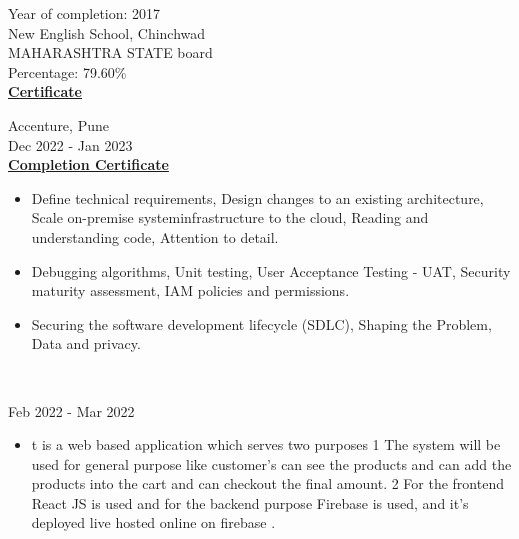 \documentclass[letterpaper,10pt]{memoir} %
\begin{document}

{Year of completion: 2017}\\
{New English School, Chinchwad}\\
{MAHARASHTRA STATE board}\\
Percentage: 79.60\% \\
\textbf{\href{https://drive.google.com/drive/u/0/folders/10_GHjB540w3rGgFYKoydtyAJAjgOLdYw}{Certificate}}\\



{Accenture, Pune}\\
{Dec 2022 - Jan 2023}\\
\textbf{\href{https://drive.google.com/drive/u/0/folders/10_GHjB540w3rGgFYKoydtyAJAjgOLdYw}{Completion Certificate}}
\begin{itemize}
	\item Define technical requirements, Design changes to an existing architecture, Scale on-premise systeminfrastructure to the cloud, Reading and understanding code, Attention to detail.

	\item Debugging algorithms, Unit testing, User Acceptance Testing - UAT, Security maturity assessment, IAM policies and permissions.

	\item Securing the software development lifecycle (SDLC), Shaping the Problem, Data and privacy.\\
\end{itemize}\\




{Feb 2022 - Mar 2022}\\
\begin{itemize}
    \item t is a web based application which serves two purposes 1 The system will be used for general purpose like customer's can see the products and can add the products into the cart and can checkout the final amount. 2 For the frontend React JS is used and for the backend purpose Firebase is used, and it’s deployed live hosted online on firebase .\\
\end{itemize}
\clearpage %
\end{document}
